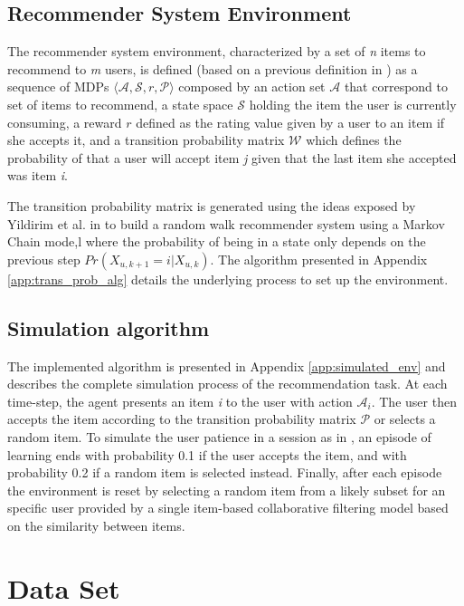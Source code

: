\subsection{Recommender System Environment}

The recommender system environment, characterized by a set of \textit{n} items to recommend to \textit{m} users, is defined (based on a previous definition in \cite{Dulac-Arnold2015}) as a sequence of MDPs $\langle \mathcal{A}, \mathcal{S}, r, \mathcal{P} \rangle$ composed by an action set $\mathcal{A}$ that correspond to set of items to recommend, a state space $\mathcal{S}$ holding the item the user is currently consuming, a reward $r$ defined as the rating value given by a user to an item if she accepts it, and a transition probability matrix $\mathcal{W}$ which defines the probability of that a user will accept item \textit{j} given that the last item she accepted was item \textit{i}. 

The transition probability matrix is generated using the ideas exposed by Yildirim et al. in \cite{yildirim2008random} to build a random walk recommender system using a Markov Chain mode,l where the probability of being in a state only depends on the previous step $Pr(X_{u, k+1} = i | X_{u, k})$. The algorithm presented in Appendix \ref{app:trans_prob_alg} details the underlying process to set up the environment.

\subsection {Simulation algorithm}
\label{sec:simalg}

The implemented algorithm is presented in Appendix \ref{app:simulated_env} and describes the complete simulation process of the recommendation task. At each time-step, the agent presents an item \textit{i} to the user with action $\mathcal{A}_i$. The user then accepts the item according to the transition probability matrix $\mathcal{P}$ or selects a random item. To simulate the user patience in a session as in \cite{Dulac-Arnold2015}, an episode of learning ends with probability 0.1 if the user accepts the item, and with probability 0.2 if a random item is selected instead. Finally, after each episode the environment is reset by selecting a random item from a likely subset for an specific user provided by a single item-based collaborative filtering model based on the similarity between items.

\section{Data Set}

